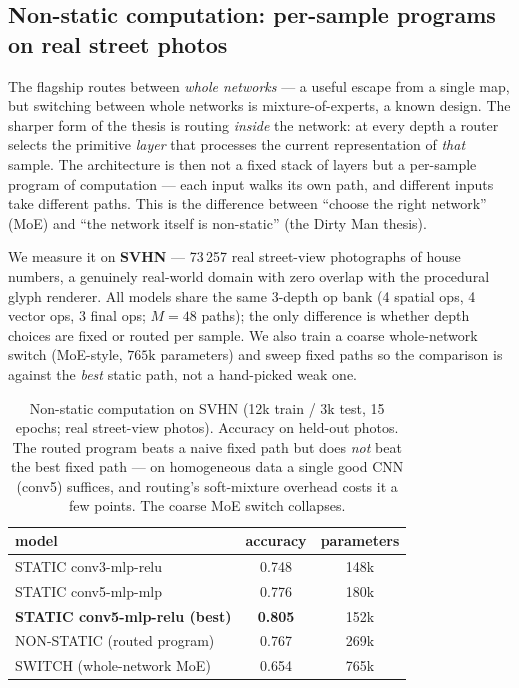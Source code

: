 \documentclass[11pt,a4paper]{article}
\begin{document}
\subsection{Non-static computation: per-sample programs on real street photos}
\label{sec:protocolF}

The flagship routes between \emph{whole networks} --- a useful escape from a
single map, but switching between whole networks is mixture-of-experts, a
known design. The sharper form of the thesis is routing \emph{inside} the
network: at every depth a router selects the primitive \emph{layer} that
processes the current representation of \emph{that} sample. The architecture
is then not a fixed stack of layers but a per-sample program of computation ---
each input walks its own path, and different inputs take different paths. This
is the difference between ``choose the right network'' (MoE) and ``the network
itself is non-static'' (the Dirty Man thesis).

We measure it on \textbf{SVHN} --- 73\,257 real street-view photographs of
house numbers, a genuinely real-world domain with zero overlap with the
procedural glyph renderer. All models share the same 3-depth op bank
(4 spatial ops, 4 vector ops, 3 final ops; $M=48$ paths); the only difference
is whether depth choices are fixed or routed per sample. We also train a
coarse whole-network switch (MoE-style, $765\text{k}$ parameters) and sweep
fixed paths so the comparison is against the \emph{best} static path, not a
hand-picked weak one.

\begin{table}[t]
  \centering
  \caption{Non-static computation on SVHN (12k train / 3k test, 15 epochs;
real street-view photos). Accuracy on held-out photos. The routed program
beats a naive fixed path but does \emph{not} beat the best fixed path --- on
homogeneous data a single good CNN (conv5) suffices, and routing's
soft-mixture overhead costs it a few points. The coarse MoE switch collapses.}
  \label{tab:nonstatic}
  \begin{tabular}{lcc}
    \toprule
    model & accuracy & parameters \\
    \midrule
    STATIC conv3-mlp-relu & 0.748 & 148k \\
    STATIC conv5-mlp-mlp & 0.776 & 180k \\
    \textbf{STATIC conv5-mlp-relu (best)} & \textbf{0.805} & 152k \\
    NON-STATIC (routed program) & 0.767 & 269k \\
    SWITCH (whole-network MoE) & 0.654 & 765k \\
    \bottomrule
  \end{tabular}
\end{table}
\end{document}
